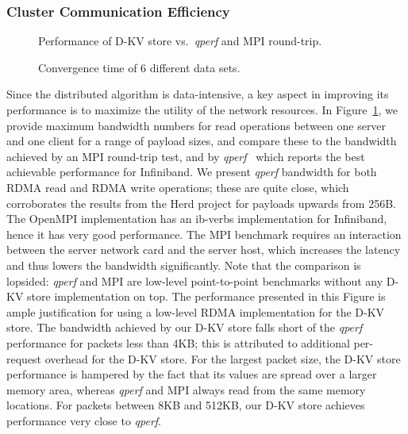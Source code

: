 \subsubsection{Cluster Communication Efficiency}

\begin{figure}[tb] %
  \centering
  \caption{Performance of D-KV store vs.\ \textit{qperf} and MPI round-trip.}
  \label{fig-qperf}
\end{figure}

\begin{figure*}[htbp] %
  \centering
  \caption{Convergence time of 6 different data sets.}
  \label{fig-ppx}
\end{figure*}

Since the distributed algorithm is data-intensive, a key aspect in improving
its performance is to maximize the utility of the network resources.
In Figure~\ref{fig-qperf}, we provide maximum bandwidth numbers for
read operations between one server and one client for a range of payload sizes,
and compare these to the bandwidth achieved by an MPI round-trip test,
and by \textit{qperf}~\cite{qperf-mellanox} which reports
the best achievable performance for Infiniband. We present \textit{qperf}
bandwidth for both RDMA read and RDMA write operations; these are quite
close, which corroborates the results from the Herd project for payloads
upwards from 256B.
The OpenMPI implementation has an ib-verbs implementation for Infiniband,
hence it has very good performance.
The MPI benchmark requires an interaction between
the server network card and the server host, which increases the latency and
thus lowers the bandwidth
significantly.
Note that the comparison is
lopsided: \textit{qperf} and MPI are low-level point-to-point benchmarks without
any D-KV store implementation on top.
The performance presented in this Figure
is ample justification for using a low-level RDMA
implementation for the D-KV store.
The bandwidth achieved by our D-KV store falls short
of the \textit{qperf} performance for packets less than 4KB; this is attributed
to additional per-request overhead for the D-KV store. For the largest packet
size, the D-KV store performance is hampered by the fact that its values
are spread over a larger memory area, whereas \textit{qperf} and MPI always read
from the same memory locations. For packets between 8KB and 512KB, our D-KV
store achieves performance very close to \textit{qperf}.

